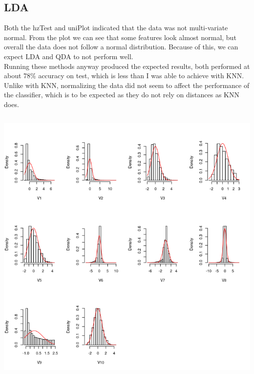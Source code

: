 \documentclass{jhwhw}
\begin{document}
    \subsection*{LDA}
    Both the hzTest and uniPlot indicated that the data was not multi-variate normal.
    From the plot we can see that some features look almost normal, but overall the data
    does not follow a normal distribution. Because of this, we can expect LDA and QDA to
    not perform well. \\
    Running these methods anyway produced the expected results, both performed at about 
    78\% accuracy on test, which is less than I was able to achieve with KNN. \\
    Unlike with KNN, normalizing the data did not seem to affect the performance
    of the classifier, which is to be expected as they do not rely on distances 
    as KNN does. \\

    \clearpage
    \inputminted[frame=lines,framesep=2mm]{text}{h.norm.txt}
    \bigbreak
    \begin{center}
	\includegraphics[scale=0.5]{hhist}
    \end{center}
\end{document}
